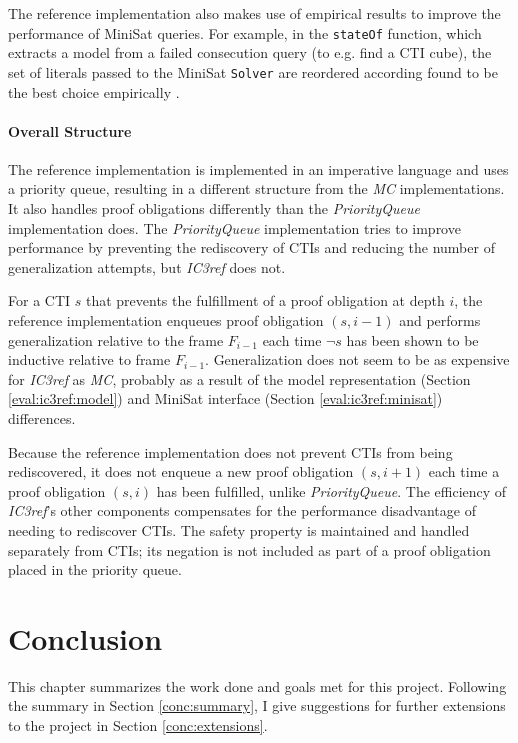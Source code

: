 \documentclass[12pt,a4paper,twoside,openright]{report}
\begin{document}
{{The reference implementation also makes use of empirical results to improve the performance of MiniSat queries.
For example, in the \verb,stateOf, function, which extracts a model from a failed consecution query
(to e.g. find a CTI cube), the set of literals passed to the MiniSat \verb,Solver, are reordered according
found to be the best choice empirically \cite{minisat}.

\subsubsection{Overall Structure}

The reference implementation is implemented in an imperative language and
uses a priority queue, resulting in a different structure from the
\emph{MC} implementations. It also handles proof obligations
differently than the \emph{PriorityQueue} implementation does.
The \emph{PriorityQueue} implementation tries to improve performance by
preventing the rediscovery of
CTIs and reducing the number of generalization attempts,
but \emph{IC3ref} does not.

For a CTI $s$ that prevents the fulfillment
of a proof obligation at depth $i$, the reference implementation enqueues proof
obligation $(s,i - 1)$
and performs generalization relative to the frame $F_{i - 1}$ each time $\neg s$ has been shown
to be inductive relative to frame $F_{i - 1}$. Generalization does not seem
to be as expensive for \emph{IC3ref} as \emph{MC}, probably as a
result of the model representation (Section \ref{eval:ic3ref:model}) and
MiniSat interface (Section \ref{eval:ic3ref:minisat}) differences.

Because the reference implementation does not prevent CTIs from being rediscovered,
it does not
enqueue a new proof obligation $(s, i+1)$ each time a proof obligation $(s, i)$ has been
fulfilled, unlike \emph{PriorityQueue}.
The efficiency of \emph{IC3ref}'s other components compensates
for the performance disadvantage of needing to rediscover CTIs.
The safety property is maintained and
handled separately from CTIs; its negation is not included as part of a proof obligation
placed in the priority queue.

\chapter{Conclusion}
\label{conc}

This chapter summarizes the work done and goals met for this project.
Following the summary in Section \ref{conc:summary}, I give
suggestions for further extensions to the project in Section \ref{conc:extensions}.

}}
\end{document}
